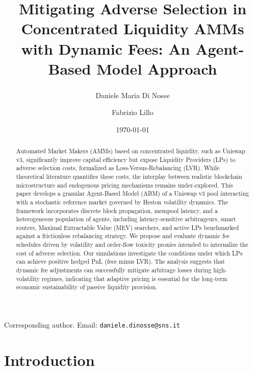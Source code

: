 \documentclass[11pt]{article}
\title{Mitigating Adverse Selection in Concentrated Liquidity AMMs with Dynamic Fees: An Agent-Based Model Approach}
\author[1]{Daniele Maria Di Nosse\textsuperscript{\dag}}
\author[1]{Fabrizio Lillo}
\affil[1]{Scuola Normale Superiore, Pisa, Italy}
\date{\today}
\begin{document}
\maketitle
\begin{center}
  \footnotesize
  \dag Corresponding author. Email: \texttt{daniele.dinosse@sns.it}
\end{center}

\begin{abstract}
Automated Market Makers (AMMs) based on concentrated liquidity, such as Uniswap v3, significantly improve capital 
efficiency but expose Liquidity Providers (LPs) to adverse selection costs, formalized as Loss-Versus-Rebalancing 
(LVR). While theoretical literature quantifies these costs, the interplay between realistic blockchain 
microstructure and endogenous pricing mechanisms remains under-explored. This paper develops a granular 
Agent-Based Model (ABM) of a Uniswap v3 pool interacting with a stochastic reference market governed by 
Heston volatility dynamics. The framework incorporates discrete block propagation, mempool latency, and a 
heterogeneous population of agents, including latency-sensitive arbitrageurs, smart routers, Maximal Extractable Value
(MEV) searchers, and active LPs benchmarked against a frictionless rebalancing strategy. We propose and 
evaluate dynamic fee schedules driven by volatility and order-flow toxicity proxies intended to internalize 
the cost of adverse selection. Our simulations investigate the conditions under which LPs can achieve positive 
hedged PnL (fees minus LVR). The analysis suggests that dynamic fee adjustments can successfully mitigate 
arbitrage losses during high-volatility regimes, indicating that adaptive pricing is essential for the 
long-term economic sustainability of passive liquidity provision.
\end{abstract}

\tableofcontents

\section{Introduction}
\end{document}
